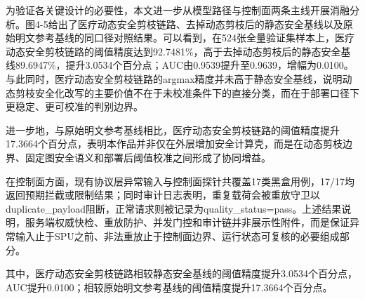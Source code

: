 为验证各关键设计的必要性，本文进一步从模型路径与控制面两条主线开展消融分析。图4-5给出了医疗动态安全剪枝链路、去掉动态剪枝后的静态安全基线以及原始明文参考基线的同口径对照结果。可以看到，在524张全量验证集样本上，医疗动态安全剪枝链路的阈值精度达到92.7481\%，高于去掉动态剪枝后的静态安全基线89.6947\%，提升3.0534个百分点；AUC由0.9539提升至0.9639，增幅为0.0100。与此同时，医疗动态安全剪枝链路的argmax精度并未高于静态安全基线，说明动态剪枝安全化改写的主要价值不在于未校准条件下的直接分类，而在于部署口径下更稳定、更可校准的判别边界。

进一步地，与原始明文参考基线相比，医疗动态安全剪枝链路的阈值精度提升17.3664个百分点，表明本作品并非仅在外层增加安全计算壳，而是在动态剪枝边界、固定图安全语义和部署后阈值校准之间形成了协同增益。

在控制面方面，现有协议层异常输入与控制面探针共覆盖17类黑盒用例，17/17均返回预期拦截或限制结果；同时审计日志表明，重复载荷会被重放守卫以duplicate\_payload阻断，正常请求则被记录为quality\_status=pass。上述结果说明，服务端权威快检、重放防护、并发门控和审计链并非展示性附件，而是保证异常输入止于SPU之前、非法重放止于控制面边界、运行状态可复核的必要组成部分。


其中，医疗动态安全剪枝链路相较静态安全基线的阈值精度提升3.0534个百分点，AUC提升0.0100；相较原始明文参考基线的阈值精度提升17.3664个百分点。
